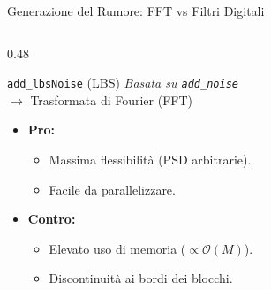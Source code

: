 \documentclass[10pt, aspectratio=169, handout]{beamer}
\begin{document}
\begin{frame}{Generazione del Rumore: FFT vs Filtri Digitali}

  \begin{columns}[T]
    
    \begin{column}{0.48\textwidth}
      \begin{block}{\texttt{add\_lbsNoise} (LBS)}
        \footnotesize
        \textit{Basata su \texttt{add\_noise}} \\
        $\rightarrow$ Trasformata di Fourier (FFT) 
        \begin{itemize}
          \item \textbf{Pro:} 
            \begin{itemize}
                \item Massima flessibilità (PSD arbitrarie).
                \item Facile da parallelizzare.
            \end{itemize}
          \item \textbf{Contro:} 
            \begin{itemize}
                \item Elevato uso di memoria ($\propto \mathcal{O}(M)$).
                \item Discontinuità ai bordi dei blocchi.
            \end{itemize}
        \end{itemize}
      \end{block}

      \vspace{0.2cm}
      \centering
    \end{column}


\end{columns}
\end{frame}
\end{document}
